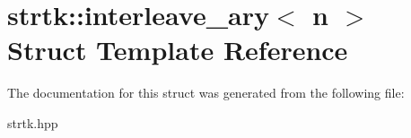 \hypertarget{structstrtk_1_1interleave__ary}{\section{strtk\-:\-:interleave\-\_\-ary$<$ n $>$ Struct Template Reference}
\label{structstrtk_1_1interleave__ary}
}


The documentation for this struct was generated from the following file\-:\begin{DoxyCompactItemize}
\item 
strtk.\-hpp\end{DoxyCompactItemize}
